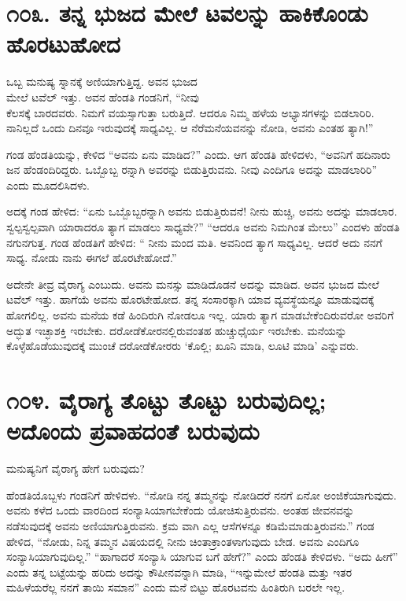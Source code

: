 \section{\num{೧೦೩. } ತನ್ನ ಭುಜದ ಮೇಲೆ ಟವಲನ್ನು ಹಾಕಿಕೊಂಡು ಹೊರಟುಹೋದ}

ಒಬ್ಬ ಮನುಷ್ಯ ಸ್ನಾನಕ್ಕೆ ಅಣಿಯಾಗುತ್ತಿದ್ದ. ಅವನ ಭುಜದ\\ಮೇಲೆ ಟವೆಲ್ ಇತ್ತು. ಅವನ ಹೆಂಡತಿ ಗಂಡನಿಗೆ, “ನೀವು\\ಕೆಲಸಕ್ಕೆ ಬಾರದವರು. ನಿಮಗೆ ವಯಸ್ಸಾಗುತ್ತಾ ಬರುತ್ತಿದೆ. ಆದರೂ ನಿಮ್ಮ ಹಳೆಯ ಅಭ್ಯಾಸಗಳನ್ನು ಬಿಡಲಾರಿರಿ. ನಾನಿಲ್ಲದೆ ಒಂದು ದಿನವೂ ಇರುವುದಕ್ಕೆ ಸಾಧ್ಯವಿಲ್ಲ. ಆ ನೆರೆಮನೆಯವನನ್ನು ನೋಡಿ, ಅವನು ಎಂತಹ ತ್ಯಾಗಿ!”

ಗಂಡ ಹೆಂಡತಿಯನ್ನು, ಕೇಳಿದ “ಅವನು ಏನು ಮಾಡಿದ?” ಎಂದು. ಆಗ ಹೆಂಡತಿ ಹೇಳಿದಳು, “ಅವನಿಗೆ ಹದಿನಾರು ಜನ ಹೆಂಡಂದಿರಿದ್ದರು. ಒಬ್ಬೊಬ್ಬ ರನ್ನಾಗಿ ಅವರನ್ನು ಬಿಡುತ್ತಿರುವನು. ನೀವು ಎಂದಿಗೂ ಅದನ್ನು ಮಾಡಲಾರಿರಿ” ಎಂದು ಮೂದಲಿಸಿದಳು.

ಅದಕ್ಕೆ ಗಂಡ ಹೇಳಿದ: “ಏನು ಒಬ್ಬೊಬ್ಬರನ್ನಾಗಿ ಅವನು ಬಿಡುತ್ತಿರುವನೆ! ನೀನು ಹುಚ್ಚಿ, ಅವನು ಅದನ್ನು ಮಾಡಲಾರ. ಸ್ವಲ್ಪಸ್ವಲ್ಪವಾಗಿ ಯಾರಾದರೂ ತ್ಯಾಗ ಮಾಡಲು ಸಾಧ್ಯವೇ?” “ಆದರೂ ಅವನು ನಿಮಗಿಂತ ಮೇಲು” ಎಂದಳು ಹೆಂಡತಿ ನಗುನಗುತ್ತ. ಗಂಡ ಹೆಂಡತಿಗೆ ಹೇಳಿದ: “ ನೀನು ಮಂದ ಮತಿ. ಅವನಿಂದ ತ್ಯಾಗ ಸಾಧ್ಯವಿಲ್ಲ. ಆದರೆ ಅದು ನನಗೆ ಸಾಧ್ಯ. ನೋಡು ನಾನು ಈಗಲೆ ಹೊರಟೇಹೋದೆ.”

ಅದೇನೇ ತೀವ್ರ ವೈರಾಗ್ಯ ಎಂಬುದು. ಅವನು ಮನಸ್ಸು ಮಾಡಿದೊಡನೆ ಅದನ್ನು ಮಾಡಿದ. ಅವನ ಭುಜದ ಮೇಲೆ ಟವೆಲ್ ಇತ್ತು. ಹಾಗೆಯೆ ಅವನು ಹೊರಟೇಹೋದ. ತನ್ನ ಸಂಸಾರಕ್ಕಾಗಿ ಯಾವ ವ್ಯವಸ್ಥೆಯನ್ನೂ ಮಾಡುವುದಕ್ಕೆ ಹೋಗಲಿಲ್ಲ. ಅವನು ಮನೆಯ ಕಡೆ ಹಿಂದಿರುಗಿ ನೋಡಲೂ ಇಲ್ಲ. ಯಾರು ತ್ಯಾಗ ಮಾಡಬೇಕೆಂದಿರುವರೋ ಅವರಿಗೆ ಅದ್ಭುತ ಇಚ್ಛಾಶಕ್ತಿ ಇರಬೇಕು. ದರೋಡೆಕೋರನಲ್ಲಿರುವಂತಹ ಹುಚ್ಚುಧೈರ್ಯ ಇರಬೇಕು. ಮನೆಯನ್ನು ಕೊಳ್ಳೆಹೊಡೆಯುವುದಕ್ಕೆ ಮುಂಚೆ ದರೋಡೆಕೋರರು ‘ಕೊಲ್ಲಿ; ಖೂನಿ ಮಾಡಿ, ಲೂಟಿ ಮಾಡಿ’ ಎನ್ನುವರು.


\section{\num{೧೦೪. } ವೈರಾಗ್ಯ ತೊಟ್ಟು ತೊಟ್ಟು ಬರುವುದಿಲ್ಲ; ಅದೊಂದು ಪ್ರವಾಹದಂತೆ ಬರುವುದು}

ಮನುಷ್ಯನಿಗೆ ವೈರಾಗ್ಯ ಹೇಗೆ ಬರುವುದು?

ಹೆಂಡತಿಯೊಬ್ಬಳು ಗಂಡನಿಗೆ ಹೇಳಿದಳು. “ನೋಡಿ ನನ್ನ ತಮ್ಮನನ್ನು ನೋಡಿದರೆ ನನಗೆ ಏನೋ ಅಂಜಿಕೆಯಾಗುವುದು. ಅವನು ಕಳೆದ ಒಂದು ವಾರದಿಂದ ಸಂನ್ಯಾಸಿಯಾಗಬೇಕೆಂದು ಯೋಚಿಸುತ್ತಿರುವನು. ಅಂತಹ ಜೀವನವನ್ನು ನಡೆಸುವುದಕ್ಕೆ ಅವನು ಅಣಿಯಾಗುತ್ತಿರುವನು. ಕ್ರಮ ವಾಗಿ ಎಲ್ಲ ಆಸೆಗಳನ್ನೂ ಕಡಿಮೆಮಾಡುತ್ತಿರುವನು.” ಗಂಡ ಹೇಳಿದ, “ನೋಡು, ನಿನ್ನ ತಮ್ಮನ ವಿಷಯದಲ್ಲಿ ನೀನು ಚಿಂತಾಕ್ರಾಂತಳಾಗುವುದು ಬೇಡ. ಅವನು ಎಂದಿಗೂ ಸಂನ್ಯಾಸಿಯಾಗುವುದಿಲ್ಲ.” “ಹಾಗಾದರೆ ಸಂನ್ಯಾಸಿ ಯಾಗುವ ಬಗೆ ಹೇಗೆ?” ಎಂದು ಹೆಂಡತಿ ಕೇಳಿದಳು. “ಅದು ಹೀಗೆ” ಎಂದು ತನ್ನ ಬಟ್ಟೆಯನ್ನು ಹರಿದು ಅದನ್ನು ಕೌಪೀನವನ್ನಾಗಿ ಮಾಡಿ, “ಇನ್ನುಮೇಲೆ ಹೆಂಡತಿ ಮತ್ತು ಇತರ ಮಹಿಳೆಯರೆಲ್ಲ ನನಗೆ ತಾಯಿ ಸಮಾನ” ಎಂದು ಮನೆ ಬಿಟ್ಟು ಹೊರಟವನು ಹಿಂತಿರುಗಿ ಬರಲೇ ಇಲ್ಲ.


